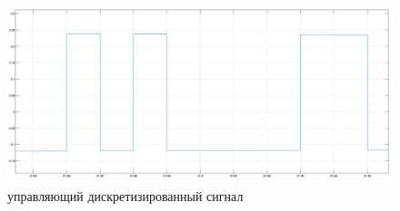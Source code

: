 \begin{figure}[!h]\centering
	\includegraphics[width=0.6\linewidth]{images/final_VSS_PWM_DCS_upr_ogr_dig}
	\caption{ управляющий дискретизированный сигнал }\label{fig:final_VSS_PWM_DCS_upr_ogr_dig}
\end{figure}

